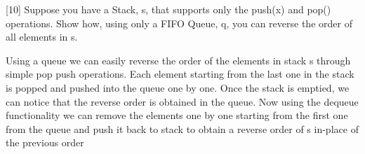 \documentclass[addpoints]{exam}
\begin{document}
\begin{questions}
[10]
Suppose you have a Stack, s, that supports only the push(x) and pop() operations. Show how, using only a FIFO Queue, q, you can reverse the order of all elements in s.
\begin{solution}
  Using a queue we can easily reverse the order of the elements in stack s through simple pop push operations. Each element starting from the last one in the stack is popped and pushed into the queue one by one. Once the stack is emptied, we can notice that the reverse order is obtained in the queue. Now using the dequeue functionality we can remove the elements one by one starting from the first one from the queue and push it back to stack to obtain a reverse order of s in-place of the previous order
\end{solution}

\end{questions}
\end{document}
